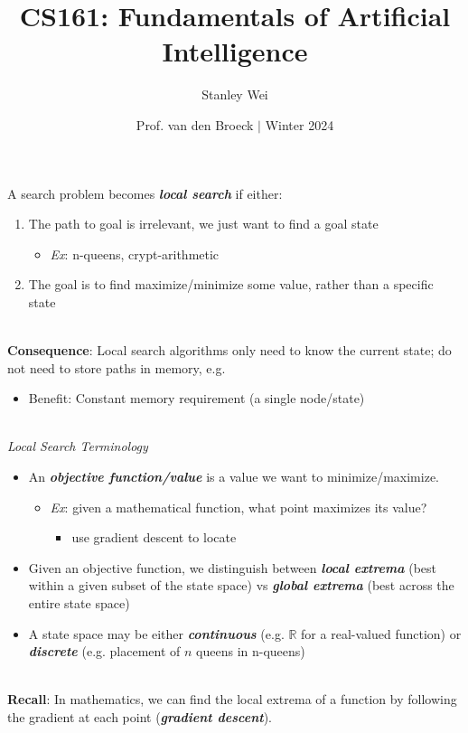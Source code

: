 \documentclass[12pt]{extarticle}
\title{CS161: Fundamentals of Artificial Intelligence}
\author{Stanley Wei}
\date{Prof. van den Broeck $\vert$ Winter 2024}
\theoremstyle{definition}
\theoremstyle{remark}
\newcommand{\pstart}[0]{\noindent}
\newcommand{\newp}[0]{~\\ \pstart}
\newcommand{\term}[1]{\noindent\textbf{\textit{#1}}}
\begin{document}
\pstart
A search problem becomes \term{local search} if either: \begin{enumerate}
    \item The path to goal is irrelevant, we just want to find a goal state \begin{itemize}
        \item \textit{Ex}: n-queens, crypt-arithmetic
    \end{itemize}
    \item The goal is to find maximize/minimize some value, rather than a specific state
\end{enumerate}

~\\ \pstart
\textbf{Consequence}: Local search algorithms only need to know the current state; do not need to store paths in memory, e.g. \begin{itemize}
    \item Benefit: Constant memory requirement (a single node/state)
\end{itemize}

\newp
\textit{Local Search Terminology} \begin{itemize}
    \item An \term{objective function/value} is a value we want to minimize/maximize. \begin{itemize}
        \item \textit{Ex}: given a mathematical function, what point maximizes its value? \begin{itemize}
            \item use gradient descent to locate
        \end{itemize}
    \end{itemize}
    \item Given an objective function, we distinguish between \term{local extrema} (best within a given subset of the state space) vs \term{global extrema} (best across the entire state space)
    \item A state space may be either \term{continuous} (e.g. $\mathbb{R}$ for a real-valued function) or \term{discrete} (e.g. placement of $n$ queens in n-queens)
\end{itemize}

~\\ \pstart
\textbf{Recall}: In mathematics, we can find the local extrema of a function by following the gradient at each point (\term{gradient descent}).
\end{document}
